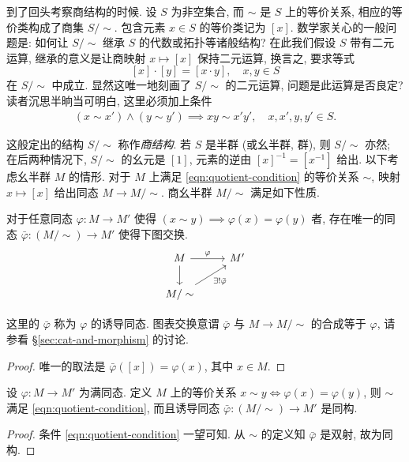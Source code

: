 到了回头考察商结构的时候. 设 $S$ 为非空集合, 而 $\sim$ 是 $S$ 上的等价关系, 相应的等价类构成了商集 $S/\sim$. 包含元素 $x \in S$ 的等价类记为 $[x]$. 数学家关心的一般问题是: 如何让 $S/\sim$ 继承 $S$ 的代数或拓扑等诸般结构? 在此我们假设 $S$ 带有二元运算, 继承的意义是让商映射 $x \mapsto [x]$ 保持二元运算, 换言之, 要求等式
\[ [x] \cdot [y] = [x \cdot y], \quad x,y \in S \]
在 $S/\sim$ 中成立. 显然这唯一地刻画了 $S/\sim$ 的二元运算, 问题是此运算是否良定? 读者沉思半晌当可明白, 这里必须加上条件
\begin{gather}\label{eqn:quotient-condition}
	(x \sim x') \wedge (y \sim y') \implies xy \sim x'y', \quad x,x',y,y' \in S.
\end{gather}

这般定出的结构 $S/\sim$ 称作\emph{商结构}. 若 $S$ 是半群 (或幺半群, 群), 则 $S/\sim$ 亦然; 在后两种情况下, $S/\sim$ 的幺元是 $[1]$, 元素的逆由 $[x]^{-1} = [x^{-1}]$ 给出. 以下考虑幺半群 $M$ 的情形. 对于 $M$ 上满足 \eqref{eqn:quotient-condition} 的等价关系 $\sim$, 映射 $x \mapsto [x]$ 给出同态 $M \to M/\sim$. 商幺半群 $M/\sim$ 满足如下性质.

\begin{proposition}\label{prop:quotient-monoid-univ-prop}
	对于任意同态 $\varphi: M \to M'$ 使得 $(x \sim y) \implies \varphi(x)=\varphi(y)$ 者, 存在唯一的同态 $\bar{\varphi}: (M/\sim) \to M'$ 使得下图交换.
	\[ \begin{tikzcd}
		M \arrow[r, "\varphi"] \arrow[d] & M' \\
		M/\sim \arrow[ru, "{\exists! \bar{\varphi}}"'] &
	\end{tikzcd} \]
\end{proposition}
这里的 $\bar{\varphi}$ 称为 $\varphi$ 的诱导同态. 图表交换意谓 $\bar{\varphi}$ 与 $M \to M/\sim$ 的合成等于 $\varphi$, 请参看 \S\ref{sec:cat-and-morphism} 的讨论.
\begin{proof}
	唯一的取法是 $\bar{\varphi}([x]) = \varphi(x)$, 其中 $x \in M$.
\end{proof}

\begin{proposition}\label{prop:1st-homomorphism-monoid}
	设 $\varphi: M \to M'$ 为满同态. 定义 $M$ 上的等价关系 $x \sim y \iff \varphi(x)=\varphi(y)$, 则 $\sim$ 满足 \eqref{eqn:quotient-condition}, 而且诱导同态 $\bar{\varphi}: (M/\sim) \to M'$ 是同构.
\end{proposition}
\begin{proof}
	条件 \eqref{eqn:quotient-condition} 一望可知. 从 $\sim$ 的定义知 $\bar{\varphi}$ 是双射, 故为同构.
\end{proof}

